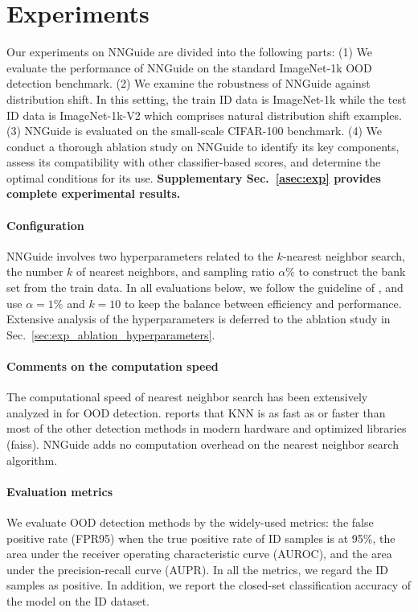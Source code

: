 \documentclass[10pt,twocolumn,letterpaper]{article}
\begin{document}
\section{Experiments}
\label{sec:exp}
Our experiments on NNGuide are divided into the following parts: (1) We evaluate the performance of NNGuide on the standard ImageNet-1k OOD detection benchmark. (2) We examine the robustness of NNGuide against distribution shift.
In this setting, the train ID data is ImageNet-1k while the test ID data is ImageNet-1k-V2 which comprises natural distribution shift examples. (3) NNGuide is evaluated on the small-scale CIFAR-100 \cite{krizhevsky2009learning} benchmark. (4) We conduct a thorough ablation study on NNGuide to identify its key components, assess its compatibility with other classifier-based scores, and determine the optimal conditions for its use. 
\textbf{Supplementary Sec.~\ref{asec:exp} provides complete experimental results.}


\paragraph{Configuration}
NNGuide involves two hyperparameters related to the $k$-nearest neighbor search, \ie the number $k$ of nearest neighbors, and sampling ratio $\alpha \%$ to construct the bank set from the train data. In all evaluations below, we follow the guideline of \cite{sun2022out}, and use $\alpha {=}1\%$ and $k {=} 10$ to keep the balance between efficiency and performance. Extensive analysis of the hyperparameters is deferred to the ablation study in Sec.~\ref{sec:exp_ablation_hyperparameters}.

\paragraph{Comments on the computation speed}
The computational speed of nearest neighbor search has been extensively analyzed in \cite{sun2022out} for OOD detection. \cite{sun2022out} reports that KNN is as fast as or faster than most of the other detection methods in modern hardware and optimized libraries (\eg faiss). NNGuide adds no computation overhead on the nearest neighbor search algorithm.



\paragraph{Evaluation metrics}
We evaluate OOD detection methods by the widely-used metrics: the false positive rate (FPR95) when the true positive rate of ID samples is at 95\%,  the area under the receiver operating characteristic curve (AUROC), and the area under the precision-recall curve (AUPR). In all the metrics, we regard the ID samples as positive. 
In addition, we report the closed-set classification accuracy of the model on the ID dataset.
\end{document}
